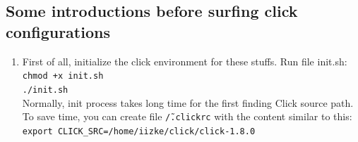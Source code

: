 \documentclass[a4paper]{article}
\begin{document}
    \subsection{Some introductions before surfing click configurations}
      \begin{enumerate}
      	\item 
      	  First of all, initialize the click environment for these stuffs. Run file init.sh: \\
      	    \texttt{chmod +x init.sh\\
      	    ./init.sh}\\
      	  Normally, init process takes long time for the first finding Click source path. To save time, you can create file \texttt{\~/.clickrc} with the content similar to this:\\
            \texttt{export CLICK\_SRC=/home/iizke/click/click-1.8.0}
        

\end{enumerate}
\end{document}

